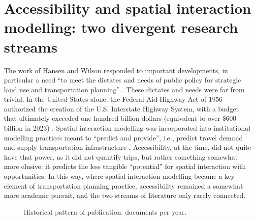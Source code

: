 \documentclass[
  10pt,
  letterpaper,
]{article}
\begin{document}
\section{Accessibility and spatial interaction modelling: two divergent
research
streams}\label{accessibility-and-spatial-interaction-modelling-two-divergent-research-streams}

The work of Hansen \citep{hansen1959} and Wilson \citep{wilson1971}
responded to important developments, in particular a need ``to meet the
dictates and needs of public policy for strategic land use and
transportation planning'' \citep{battyChronicleScientificPlanning1994}.
These dictates and needs were far from trivial. In the United States
alone, the Federal-Aid Highway Act of 1956 authorized the creation of
the U.S. Interstate Highway System, with a budget that ultimately
exceeded one hundred billion dollars (equivalent to over \$600 billion
in 2023)
\citep{weinerUrbanTransportationPlanning2016, mdotMnDOTJoins2007}.
Spatial interaction modelling was incorporated into institutional
modelling practices meant to ``predict and provide'', i.e., predict
travel demand and supply transportation infrastructure
\citep{kovatch1971modeling, weinerUrbanTransportationPlanning2016}.
Accessibility, at the time, did not quite have that power, as it did not
quantify trips, but rather something somewhat more elusive: it predicts
the less tangible ``potential'' for spatial interaction with
opportunities. In this way, where spatial interaction modelling became a
key element of transportation planning practice, accessibility remained
a somewhat more academic pursuit, and the two streams of literature only
rarely connected.

\begin{figure}[H]


\caption{\label{fig-docs-per-year}Historical pattern of publication:
documents per year.}

\end{figure}%
\end{document}
